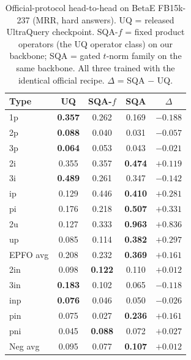 \documentclass[journal]{IEEEtran}
\begin{document}
\begin{table}[t]
\centering
\caption{Official-protocol head-to-head on BetaE FB15k-237 (MRR, hard
answers). UQ = released UltraQuery checkpoint. SQA-$f$ = fixed product
operators (the UQ operator class) on our backbone; SQA = gated $t$-norm
family on the same backbone. All three trained with the identical official
recipe. $\Delta$ = SQA $-$ UQ.}
\label{tab:main}
\begin{tabular}{lcccc}
\toprule
Type & UQ & SQA-$f$ & \textbf{SQA} & $\Delta$ \\
\midrule
1p & \textbf{0.357} & 0.262 & 0.169 & $-0.188$ \\
2p & \textbf{0.088} & 0.040 & 0.031 & $-0.057$ \\
3p & \textbf{0.064} & 0.053 & 0.043 & $-0.021$ \\
2i & 0.355 & 0.357 & \textbf{0.474} & $+0.119$ \\
3i & \textbf{0.489} & 0.261 & 0.347 & $-0.142$ \\
ip & 0.129 & 0.446 & \textbf{0.410} & $+0.281$ \\
pi & 0.176 & 0.218 & \textbf{0.507} & $+0.331$ \\
2u & 0.127 & 0.333 & \textbf{0.963} & $+0.836$ \\
up & 0.085 & 0.114 & \textbf{0.382} & $+0.297$ \\
\midrule
EPFO avg & 0.208 & 0.232 & \textbf{0.369} & $+0.161$ \\
\midrule
2in & 0.098 & \textbf{0.122} & 0.110 & $+0.012$ \\
3in & \textbf{0.183} & 0.102 & 0.065 & $-0.118$ \\
inp & \textbf{0.076} & 0.046 & 0.050 & $-0.026$ \\
pin & 0.075 & 0.027 & \textbf{0.236} & $+0.161$ \\
pni & 0.045 & \textbf{0.088} & 0.072 & $+0.027$ \\
Neg avg & 0.095 & 0.077 & \textbf{0.107} & $+0.012$ \\
\bottomrule
\end{tabular}
\end{table}
\end{document}
